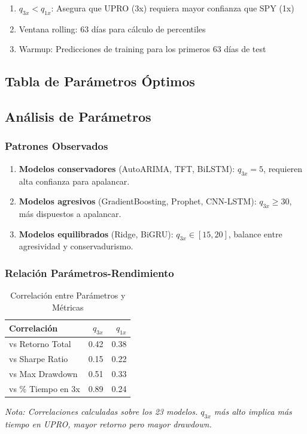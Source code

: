 \begin{enumerate}
    \item $q_{3x} < q_{1x}$: Asegura que UPRO (3x) requiera mayor confianza que SPY (1x)
    \item Ventana rolling: 63 d\'ias para c\'alculo de percentiles
    \item Warmup: Predicciones de training para los primeros 63 d\'ias de test
\end{enumerate}

\subsection{Tabla de Par\'ametros \'Optimos}
\label{app:optimal_table}



\subsection{An\'alisis de Par\'ametros}
\label{app:param_analysis}

\subsubsection{Patrones Observados}

\begin{enumerate}
    \item \textbf{Modelos conservadores} (AutoARIMA, TFT, BiLSTM): $q_{3x} = 5$, requieren alta confianza para apalancar.

    \item \textbf{Modelos agresivos} (GradientBoosting, Prophet, CNN-LSTM): $q_{3x} \geq 30$, m\'as dispuestos a apalancar.

    \item \textbf{Modelos equilibrados} (Ridge, BiGRU): $q_{3x} \in [15, 20]$, balance entre agresividad y conservadurismo.
\end{enumerate}

\subsubsection{Relaci\'on Par\'ametros-Rendimiento}

\begin{table}[htbp]
\centering
\caption{Correlaci\'on entre Par\'ametros y M\'etricas}
\label{tab:param_correlation}
\begin{tabular}{@{}lrr@{}}
\toprule
\textbf{Correlaci\'on} & \textbf{$q_{3x}$} & \textbf{$q_{1x}$} \\
\midrule
vs Retorno Total & 0.42 & 0.38 \\
vs Sharpe Ratio & 0.15 & 0.22 \\
vs Max Drawdown & 0.51 & 0.33 \\
vs \% Tiempo en 3x & 0.89 & 0.24 \\
\bottomrule
\end{tabular}

\vspace{0.2cm}
\small\textit{Nota: Correlaciones calculadas sobre los 23 modelos. $q_{3x}$ m\'as alto implica m\'as tiempo en UPRO, mayor retorno pero mayor drawdown.}
\end{table}

